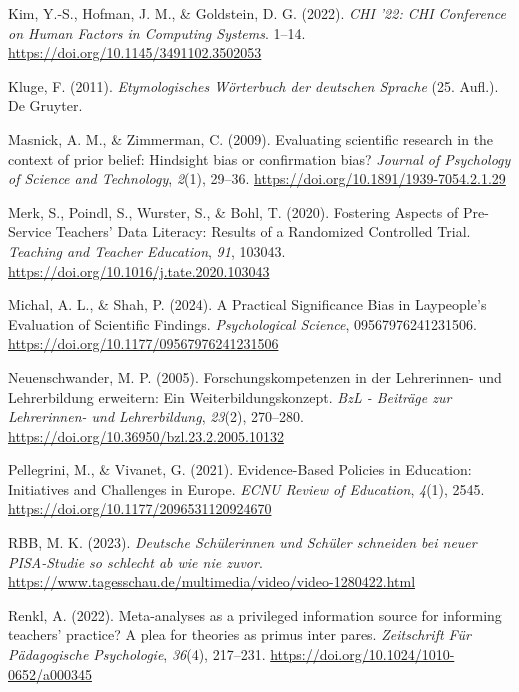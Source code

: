 \documentclass[
  jou,
  floatsintext,
  longtable,
  nolmodern,
  notxfonts,
  notimes,
  colorlinks=true,linkcolor=blue,citecolor=blue,urlcolor=blue]{apa7}
\newlength{\cslhangindent}
\newenvironment{CSLReferences}[2] %
 {\begin{list}{}{%
  \setlength{\itemindent}{0pt}
  \setlength{\leftmargin}{0pt}
  \setlength{\parsep}{0pt}
  \ifodd #1
   \setlength{\leftmargin}{\cslhangindent}
   \setlength{\itemindent}{-1\cslhangindent}
  \fi
  \setlength{\itemsep}{#2\baselineskip}}}
 {\end{list}}
\begin{document}
\begin{CSLReferences}{1}{0}
Kim, Y.-S., Hofman, J. M., \& Goldstein, D. G. (2022). \emph{CHI '22:
CHI Conference on Human Factors in Computing Systems}. 1--14.
\url{https://doi.org/10.1145/3491102.3502053}

Kluge, F. (2011). \emph{Etymologisches Wörterbuch der deutschen Sprache}
(25. Aufl.). De Gruyter.

Masnick, A. M., \& Zimmerman, C. (2009). Evaluating scientific research
in the context of prior belief: Hindsight bias or confirmation bias?
\emph{Journal of Psychology of Science and Technology}, \emph{2}(1),
29--36. \url{https://doi.org/10.1891/1939-7054.2.1.29}

Merk, S., Poindl, S., Wurster, S., \& Bohl, T. (2020). Fostering Aspects
of Pre-Service Teachers' Data Literacy: {Results} of a Randomized
Controlled Trial. \emph{Teaching and Teacher Education}, \emph{91},
103043. \url{https://doi.org/10.1016/j.tate.2020.103043}

Michal, A. L., \& Shah, P. (2024). A Practical Significance Bias in
Laypeople{'}s Evaluation of Scientific Findings. \emph{Psychological
Science}, 09567976241231506.
\url{https://doi.org/10.1177/09567976241231506}

Neuenschwander, M. P. (2005). Forschungskompetenzen in der Lehrerinnen-
und Lehrerbildung erweitern: Ein Weiterbildungskonzept. \emph{BzL -
Beiträge zur Lehrerinnen- und Lehrerbildung}, \emph{23}(2), 270--280.
\url{https://doi.org/10.36950/bzl.23.2.2005.10132}

Pellegrini, M., \& Vivanet, G. (2021). Evidence-Based Policies in
Education: Initiatives and Challenges in Europe. \emph{ECNU Review of
Education}, \emph{4}(1), 2545.
\url{https://doi.org/10.1177/2096531120924670}

RBB, M. K. (2023). \emph{Deutsche Schülerinnen und Schüler schneiden bei
neuer PISA-Studie so schlecht ab wie nie zuvor}.
\url{https://www.tagesschau.de/multimedia/video/video-1280422.html}

Renkl, A. (2022). Meta-analyses as a privileged information source for
informing teachers' practice? A plea for theories as primus inter pares.
\emph{Zeitschrift Für Pädagogische Psychologie}, \emph{36}(4), 217--231.
\url{https://doi.org/10.1024/1010-0652/a000345}


\end{CSLReferences}
\end{document}
